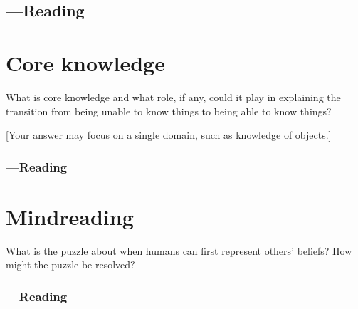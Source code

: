 \documentclass[12pt,\papersize]{extarticle}
\begin{document}
\subsection{---Reading}









\clearpage

\section{Core knowledge}
What is core knowledge and what role, if any, could it play in explaining the transition from being unable to know things to being able to know things?

[Your answer may focus on a  single domain,  such as knowledge of objects.]

\subsubsection{---Reading}







\clearpage

\section{Mindreading}
What is the puzzle about when humans can first represent others’ beliefs?
How might the puzzle be resolved?

\subsubsection{---Reading}


\end{document}
